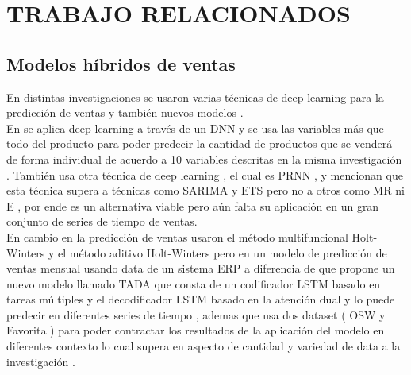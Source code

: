 \documentclass[conference]{IEEEtran}
\begin{document}
\section{TRABAJO RELACIONADOS}

\subsection{Modelos híbridos de ventas}
En distintas investigaciones se usaron varias técnicas de deep learning para la predicción de ventas \cite{b1} \cite{b2} y también nuevos modelos \cite{b5} \cite{b6} \cite{b7}.\\
En \cite{b1} se aplica deep learning a través de un DNN y se usa las variables más que todo del producto para poder predecir la cantidad de productos que se venderá de forma individual de acuerdo a 10 variables descritas en la misma investigación \cite{b1}  . También \cite{b2} usa otra técnica de deep learning , el cual es PRNN , y mencionan que esta técnica supera a técnicas como SARIMA y ETS pero no a otros como MR ni E , por ende es un alternativa viable pero aún falta su aplicación en un gran conjunto de series de tiempo de ventas.\\
En cambio en la predicción de ventas \cite{b5} usaron el método multifuncional Holt-Winters y el método aditivo Holt-Winters pero en un modelo de predicción de ventas mensual usando data de un sistema ERP a diferencia de  \cite{b6} que propone un nuevo modelo llamado TADA que consta de un codificador LSTM basado en tareas múltiples y el decodificador LSTM basado en la atención dual  y lo puede predecir en diferentes series de tiempo , ademas que usa dos dataset ( OSW y Favorita ) para poder contractar los resultados de la aplicación del modelo en diferentes contexto lo cual supera en aspecto de cantidad y variedad de data a la investigación \cite{b5}.\\
\end{document}

